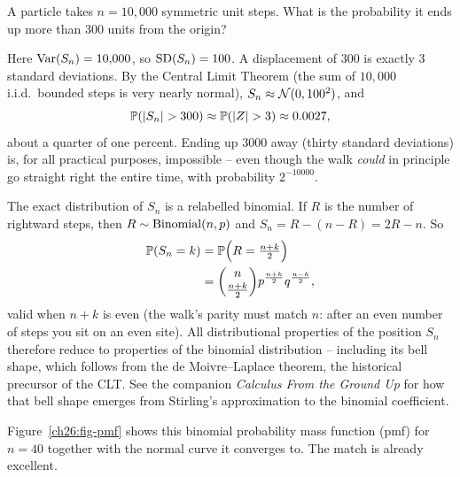 \begin{example}
\label{ch26:ex-howfar}
A particle takes $n = 10{,}000$ symmetric unit steps. What is the probability
it ends up more than $300$ units from the origin?

Here $\Var(S_n) = 10{,}000$, so $\SD(S_n) = 100$. A displacement of $300$ is
exactly $3$ standard deviations. By the Central Limit Theorem (the sum of
$10{,}000$ i.i.d.\ bounded steps is very nearly normal), $S_n \approx
\Normal(0, 100^2)$, and
\[
  \P(\abs{S_n} > 300) \approx \P(\abs{Z} > 3) \approx 0.0027,
\]
about a quarter of one percent. Ending up $3000$ away (thirty standard
deviations) is, for all practical purposes, impossible -- even though the walk
\emph{could} in principle go straight right the entire time, with probability
$2^{-10000}$.
\end{example}

\begin{connectionbox}
The exact distribution of $S_n$ is a relabelled binomial. If $R$ is the number
of rightward steps, then $R \sim \Bin(n, p)$ and $S_n = R - (n - R) = 2R - n$.
So
\begin{align*}
  \P(S_n = k) &= \P\!\Big(R = \tfrac{n+k}{2}\Big) \\
  &= \binom{n}{\frac{n+k}{2}} p^{\frac{n+k}{2}} q^{\frac{n-k}{2}},
\end{align*}
valid when $n + k$ is even (the walk's parity must match $n$: after an even
number of steps you sit on an even site). All distributional properties of the
position $S_n$ therefore reduce to properties of the binomial distribution --
including its bell shape, which follows from the de
Moivre--Laplace theorem, the historical precursor of the CLT. See the companion
\emph{Calculus From the Ground Up} for how that bell shape emerges from
Stirling's approximation to the binomial coefficient.
\end{connectionbox}

Figure~\ref{ch26:fig-pmf} shows this binomial probability mass function (pmf) for $n = 40$ together with
the normal curve it converges to. The match is already excellent.

